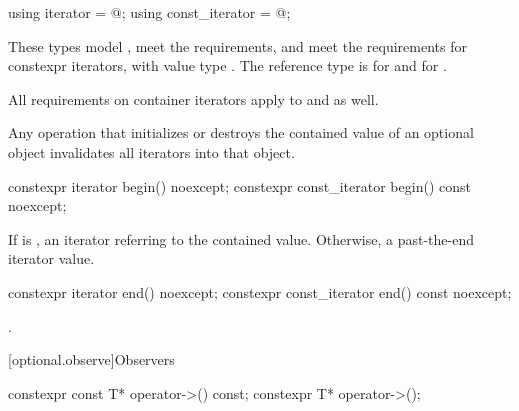 %
%
\begin{itemdecl}
using iterator = @\impdef@;
using const_iterator = @\impdef@;
\end{itemdecl}

\begin{itemdescr}
\pnum
These types model , meet the  requirements, and meet the requirements for constexpr iterators, with value type . The reference type is  for  and  for .

\pnum
All requirements on container iterators apply to  and  as well.

\pnum
Any operation that initializes or destroys the contained value of an optional object invalidates all iterators into that object.
\end{itemdescr}

%
\begin{itemdecl}
constexpr iterator begin() noexcept;
constexpr const_iterator begin() const noexcept;
\end{itemdecl}

\begin{itemdescr}
\pnum
\returns
If  is , an iterator referring to the contained value. Otherwise, a past-the-end iterator value.
\end{itemdescr}

%
\begin{itemdecl}
constexpr iterator end() noexcept;
constexpr const_iterator end() const noexcept;
\end{itemdecl}

\begin{itemdescr}
\pnum
\returns
{}.
\end{itemdescr}

[optional.observe]{Observers}

%
\begin{itemdecl}
constexpr const T* operator->() const;
constexpr T* operator->();
\end{itemdecl}

